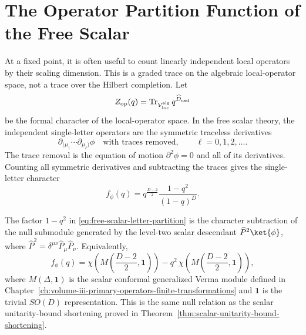 \section{The Operator Partition Function of the Free Scalar}

At a fixed point, it is often useful to count linearly independent local
operators by their scaling dimension.  This is a graded trace on the algebraic
local-operator space, not a trace over the Hilbert completion.  Let
\[
  Z_{\rm op}(q)
  =
  \operatorname{Tr}_{\mathcal V_{\rm loc}^{\rm alg}}
  q^{\widehat D_{\rm rad}}
\]
be the formal character of the local-operator space.  In the free scalar
theory, the independent single-letter operators are the symmetric traceless
derivatives
\[
  \partial_{(\mu_1}\cdots\partial_{\mu_\ell)}\phi
  \quad\text{with traces removed},
  \qquad
  \ell=0,1,2,\ldots .
\]
The trace removal is the equation of motion \(\partial^2\phi=0\) and all of
its derivatives.  Counting all symmetric derivatives and subtracting the
traces gives the single-letter character
\begin{equation}
  f_\phi(q)
  =
  q^{\frac{D-2}{2}}
  \frac{1-q^2}{(1-q)^D}.
  \label{eq:free-scalar-letter-partition}
\end{equation}

\begin{proposition}
\label{prop:free-scalar-letter-short-module-character}
The factor \(1-q^2\) in
\eqref{eq:free-scalar-letter-partition} is the character subtraction of the
null submodule generated by the level-two scalar descendant
\(\widehat P^2\ket{\phi}\), where
\(\widehat P^2=\delta^{\mu\nu}\widehat P_\mu\widehat P_\nu\).  Equivalently,
\[
  f_\phi(q)
  =
  \chi\!\left(M\!\left(\frac{D-2}{2},\mathbf 1\right)\right)
  -
  q^2\,
  \chi\!\left(M\!\left(\frac{D-2}{2},\mathbf 1\right)\right),
\]
where \(M(\Delta,\mathbf 1)\) is the scalar conformal generalized Verma module
defined in Chapter~\ref{ch:volume-iii-primary-operators-finite-transformations}
and \(\mathbf 1\) is the trivial \(SO(D)\) representation.
This is the same null relation as the scalar unitarity-bound shortening
proved in Theorem~\ref{thm:scalar-unitarity-bound-shortening}.
\end{proposition}

